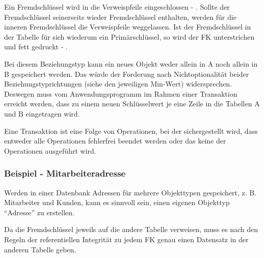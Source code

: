           Ein Fremdschl\"ussel wird in die Verweispfeile eingeschlossen - . Sollte der Fremd\-schl\"us\-sel seinerseits wieder Fremd\-schl\"us\-sel enthalten, werden f\"ur die inneren Fremd\-schl\"us\-sel die Verweispfeile weggelassen. Ist der Fremdschl\"ussel in der Tabelle f\"ur sich wiederum ein Prim\"arschl\"ussel, so wird der FK unterstrichen und fett gedruckt - .

        \begin{center}
        \end{center}


          Bei diesem Beziehungstyp kann ein neues Objekt weder allein in A noch allein in B gespeichert werden. Das w\"urde der Forderung nach Nichtoptionalit\"at beider Beziehungstyprichtungen (siehe den jeweiligen Min-Wert) widersprechen. Deswegen muss vom Anwendungsprogramm im Rahmen einer Transaktion erreicht werden, dass zu einem neuen Schl\"usselwert je eine Zeile in die Tabellen A und B eingetragen wird.
          \begin{merke}
            Eine Transaktion ist eine Folge von Operationen, bei der sichergestellt wird, dass entweder alle Operationen fehlerfrei beendet werden oder das keine der Operationen ausgef\"uhrt wird.
          \end{merke}
        \subsubsection{Beispiel - Mitarbeiteradresse}
          Werden in einer Datenbank Adressen f\"ur mehrere Objekttypen gespeichert, z. B. Mitarbeiter und Kunden, kann es sinnvoll sein, einen eigenen Objekttyp \enquote{Adresse} zu erstellen.

					Da die Fremdschl\"ussel jeweils auf die andere Tabelle verweisen, muss es nach den Regeln der referentiellen Integrit\"at zu jedem FK genau einen Datensatz in der anderen Tabelle geben.

